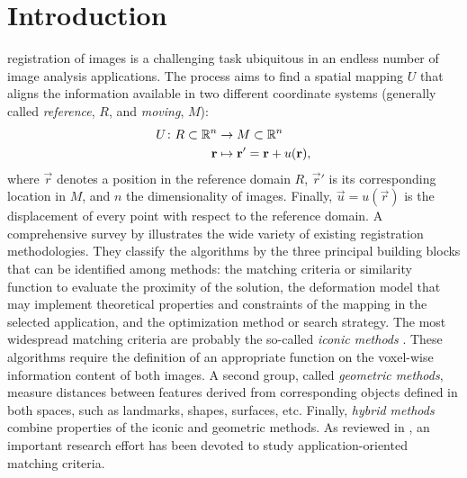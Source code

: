 \section{Introduction}
\label{sec:introduction}

 registration of images is a challenging task ubiquitous
  in an endless number of image analysis applications.
The process aims to find a spatial mapping $U$ that aligns the information available
  in two different coordinate systems (generally called
  \emph{reference}, $R$, and \emph{moving}, $M$):
  \begin{align}
  U\colon R \subset \mathbb{R}^n &\to M \subset \mathbb{R}^n \notag\\
  \vec{r} &\mapsto \vec{r}' =\vec{r}+u(\vec{r}),
  \label{eq:transform}
  \end{align}
  where $\vec{r}$ denotes a position in the reference domain $R$, $\vec{r}'$ is
  its corresponding location in $M$, and $n$ the dimensionality of images.
Finally, $\vec{u} = u(\vec{r})$ is the displacement of every point with respect
  to the reference domain.
A comprehensive survey by \citeauthor{sotiras_deformable_2013} \citep{sotiras_deformable_2013}
  illustrates the wide variety of existing registration methodologies.
They classify the algorithms by the three principal building blocks that can be identified
  among methods: the matching criteria or similarity function to evaluate the proximity of
  the solution, the deformation model that may implement theoretical properties and constraints
  of the mapping in the selected application, and the optimization method or search strategy.
The most widespread matching criteria are probably the so-called \emph{iconic
  methods} \citep{sotiras_deformable_2013}.
These algorithms require the definition of an appropriate function on the voxel-wise information
  content of both images.
A second group, called \emph{geometric methods}, measure distances between features derived from
  corresponding objects defined in both spaces, such as landmarks, shapes, surfaces, etc.
Finally, \emph{hybrid methods} combine properties of the iconic and geometric methods.
As reviewed in \citep{sotiras_deformable_2013}, an important research effort has been devoted to
  study application-oriented matching criteria.


